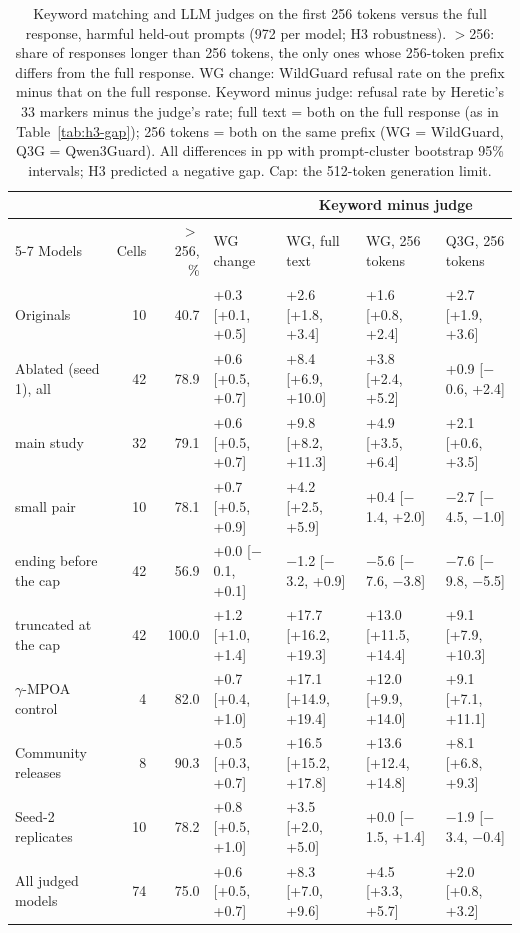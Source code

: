 \begin{table}[t]
\centering\footnotesize
\setlength{\tabcolsep}{2.8pt}
\caption{Keyword matching and LLM judges on the first 256 tokens versus the full response, harmful held-out prompts
(972 per model; H3 robustness). $>$256: share of responses longer than 256 tokens, the only ones whose 256-token
prefix differs from the full response. WG change: WildGuard refusal rate on the prefix minus that on the full
response. Keyword minus judge: refusal rate by Heretic's 33 markers minus the judge's rate; full text = both on the
full response (as in Table~\ref{tab:h3-gap}); 256 tokens = both on the same prefix (WG = WildGuard, Q3G =
Qwen3Guard). All differences in pp with prompt-cluster bootstrap 95\% intervals; H3 predicted a negative gap. Cap:
the 512-token generation limit.}
\label{tab:trunc256}
\begin{tabular}{lrrllll}
\toprule
 & & & & \multicolumn{3}{c}{Keyword minus judge} \\
\cmidrule(lr){5-7}
Models & Cells & $>$256, \% & WG change & WG, full text & WG, 256 tokens & Q3G, 256 tokens \\
\midrule
Originals & 10 & 40.7 & +0.3 [+0.1, +0.5] & +2.6 [+1.8, +3.4] & +1.6 [+0.8, +2.4] & +2.7 [+1.9, +3.6] \\
\midrule
Ablated (seed 1), all & 42 & 78.9 & +0.6 [+0.5, +0.7] & +8.4 [+6.9, +10.0] & +3.8 [+2.4, +5.2] & +0.9 [$-$0.6, +2.4] \\
\quad main study & 32 & 79.1 & +0.6 [+0.5, +0.7] & +9.8 [+8.2, +11.3] & +4.9 [+3.5, +6.4] & +2.1 [+0.6, +3.5] \\
\quad small pair & 10 & 78.1 & +0.7 [+0.5, +0.9] & +4.2 [+2.5, +5.9] & +0.4 [$-$1.4, +2.0] & $-$2.7 [$-$4.5, $-$1.0] \\
\quad ending before the cap & 42 & 56.9 & +0.0 [$-$0.1, +0.1] & $-$1.2 [$-$3.2, +0.9] & $-$5.6 [$-$7.6, $-$3.8] & $-$7.6 [$-$9.8, $-$5.5] \\
\quad truncated at the cap & 42 & 100.0 & +1.2 [+1.0, +1.4] & +17.7 [+16.2, +19.3] & +13.0 [+11.5, +14.4] & +9.1 [+7.9, +10.3] \\
\midrule
$\gamma$-MPOA control & 4 & 82.0 & +0.7 [+0.4, +1.0] & +17.1 [+14.9, +19.4] & +12.0 [+9.9, +14.0] & +9.1 [+7.1, +11.1] \\
Community releases & 8 & 90.3 & +0.5 [+0.3, +0.7] & +16.5 [+15.2, +17.8] & +13.6 [+12.4, +14.8] & +8.1 [+6.8, +9.3] \\
Seed-2 replicates & 10 & 78.2 & +0.8 [+0.5, +1.0] & +3.5 [+2.0, +5.0] & +0.0 [$-$1.5, +1.4] & $-$1.9 [$-$3.4, $-$0.4] \\
\midrule
All judged models & 74 & 75.0 & +0.6 [+0.5, +0.7] & +8.3 [+7.0, +9.6] & +4.5 [+3.3, +5.7] & +2.0 [+0.8, +3.2] \\
\bottomrule
\end{tabular}
\end{table}
